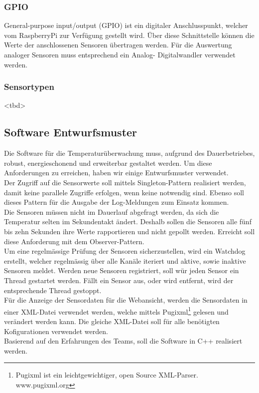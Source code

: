 \subsubsection{GPIO}
General-purpose input/output (GPIO) ist ein digitaler Anschlusspunkt, welcher vom RaspberryPi zur Verfügung gestellt wird. Über diese Schnittstelle können die Werte der anschlossenen Sensoren übertragen werden. Für die Auswertung analoger Sensoren muss entsprechend ein Analog- Digitalwandler verwendet werden.

\subsubsection{Sensortypen}
<tbd>

\subsection{Software Entwurfsmuster}
Die Software für die Temperaturüberwachung muss, aufgrund des Dauerbetriebes, robust, energieschonend und erweiterbar gestaltet werden. Um diese Anforderungen zu erreichen, haben wir einige Entwurfsmuster verwendet.\\
Der Zugriff auf die Sensorwerte soll mittels Singleton-Pattern realisiert werden, damit keine parallele Zugriffe erfolgen, wenn keine notwendig sind. Ebenso soll dieses Pattern für die Ausgabe der Log-Meldungen zum Einsatz kommen.\\
Die Sensoren müssen nicht im Dauerlauf abgefragt werden, da sich die Temperatur selten im Sekundentakt ändert. Deshalb sollen die Sensoren alle fünf bis zehn Sekunden ihre Werte rapportieren und nicht gepollt werden. Erreicht soll diese Anforderung mit dem Observer-Pattern.\\
Um eine regelmässige Prüfung der Sensoren sicherzustellen, wird ein Watchdog erstellt, welcher regelmässig über alle Kanäle iteriert und aktive, sowie inaktive Sensoren meldet. Werden neue Sensoren registriert, soll wür jeden Sensor ein Thread gestartet werden. Fällt ein Sensor aus, oder wird entfernt, wird der entsprechende Thread gestoppt.\\
Für die Anzeige der Sensordaten für die Webansicht, werden die Sensordaten in einer XML-Datei verwendet werden, welche mittels Pugixml\footnote{Pugixml ist ein leichtgewichtiger, open Source XML-Parser. www.pugixml.org} gelesen und verändert werden kann. Die gleiche XML-Datei soll für alle benötigten Kofigurationen verwendet werden.\\
Basierend auf den Erfahrungen des Teams, soll die Software in C++ realisiert werden.
